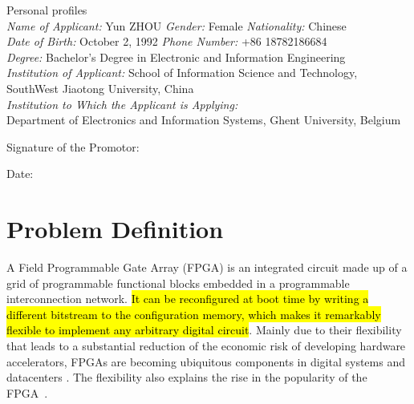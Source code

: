 \documentclass[a4paper,oneside,12pt]{article}
\begin{document}
\vspace{5mm}
\begin{description*}

\item[Personal profiles]\ \\

\emph{Name of Applicant:} Yun ZHOU
\hspace{10mm}\emph{Gender:} Female
\hspace{10mm}\emph{Nationality:} Chinese\\
\emph{Date of Birth:} October 2, 1992
\hspace{13mm}\emph{Phone Number:} +86 18782186684\\
\emph{Degree:} Bachelor's Degree in Electronic and Information Engineering\\
\emph{Institution of Applicant:} School of Information Science and Technology, SouthWest Jiaotong University, China\\
\emph{Institution to Which the Applicant is Applying:}\\
Department of Electronics and Information Systems, Ghent University, Belgium
\end{description*}
\begin{description*}
\item[Signature of the Promotor:]\ \\
\item[Date:]\
\end{description*}
\clearpage

\section{Problem Definition}
A Field Programmable Gate Array (FPGA) is an integrated circuit made up of a grid of programmable functional blocks embedded in a programmable interconnection network. \hl{It can be reconfigured  at boot time by writing a different bitstream to the configuration memory, which makes it remarkably flexible to implement any arbitrary digital circuit}.
Mainly due to their flexibility that leads to a substantial reduction of the economic risk of developing hardware accelerators, FPGAs are becoming ubiquitous components in digital systems and datacenters \cite{ovtcharov2015accelerating,putnam2015reconfigurable}. The flexibility also explains the rise in the popularity of the FPGA~\cite{putnam2015reconfigurable}.
\end{document}
